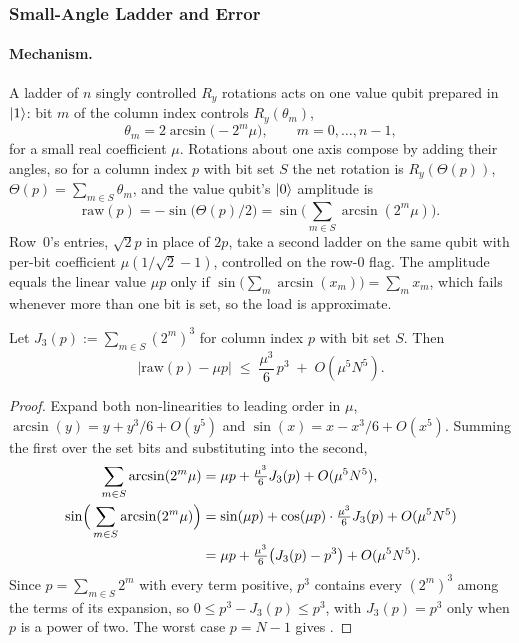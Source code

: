 \subsubsection{Small-Angle Ladder and Error}
\label{app:ladder}

\paragraph{Mechanism.} A ladder of $n$ singly controlled $R_y$ rotations acts on one value qubit prepared in $\ket{1}$: bit $m$ of the column index controls $R_y(\theta_m)$,
\begin{equation}
    \theta_m = 2\arcsin\!\big({-}2^m\mu\big), \qquad m = 0, \dots, n-1,
    \label{eq:app-ladder-primary}
\end{equation}
for a small real coefficient $\mu$. Rotations about one axis compose by adding their angles, so for a column index $p$ with bit set $S$ the net rotation is $R_y(\Theta(p))$, $\Theta(p) = \sum_{m \in S} \theta_m$, and the value qubit's $\ket{0}$ amplitude is
\begin{equation}
    \mathrm{raw}(p) = -\sin\!\big(\Theta(p)/2\big) = \sin\!\Big(\textstyle\sum_{m \in S} \arcsin(2^m\mu)\Big).
    \label{eq:app-ladder-raw}
\end{equation}
Row~0's entries, $\sqrt{2}p$ in place of $2p$, take a second ladder on the same qubit with per-bit coefficient $\mu(1/\sqrt{2} - 1)$, controlled on the row-0 flag. The amplitude equals the linear value $\mu p$ only if $\sin\big(\sum_m \arcsin(x_m)\big) = \sum_m x_m$, which fails whenever more than one bit is set, so the load is approximate.

\begin{proposition}
\label{prop:epsilon-G}
Let $J_3(p) := \sum_{m \in S} (2^m)^3$ for column index $p$ with bit set $S$. Then
\begin{equation}
    \big|\mathrm{raw}(p) - \mu p\big| \;\le\; \frac{\mu^3}{6}\,p^3 \;+\; O(\mu^5 N^5).
    \label{eq:app-ladder-bound}
\end{equation}
\end{proposition}

\begin{proof}
Expand both non-linearities to leading order in $\mu$, $\arcsin(y) = y + y^3/6 + O(y^5)$ and $\sin(x) = x - x^3/6 + O(x^5)$. Summing the first over the set bits and substituting into the second,
\begin{align}
    \sum_{m \in S} \arcsin(2^m\mu) &= \mu p + \tfrac{\mu^3}{6} J_3(p) + O(\mu^5 N^5), \\
    \sin\!\Big(\sum_{m \in S} \arcsin(2^m\mu)\Big)
        &= \sin(\mu p) + \cos(\mu p)\cdot\tfrac{\mu^3}{6}J_3(p) + O(\mu^5N^5) \notag\\
        &= \mu p + \tfrac{\mu^3}{6}\big(J_3(p) - p^3\big) + O(\mu^5N^5).
\end{align}
Since $p = \sum_{m\in S} 2^m$ with every term positive, $p^3$ contains every $(2^m)^3$ among the terms of its expansion, so $0\le p^3-J_3(p)\le p^3$, with $J_3(p)=p^3$ only when $p$ is a power of two. The worst case $p = N-1$ gives .
\end{proof}

